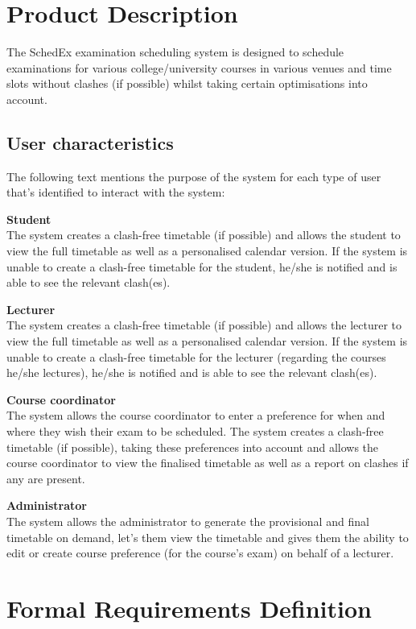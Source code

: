 \documentclass{article}
\begin{document}
\section{Product Description}

The SchedEx examination scheduling system is designed to schedule examinations for various college/university courses in various venues and time slots without clashes (if possible) whilst taking certain optimisations into account.

\subsection{User characteristics}

The following text mentions the purpose of the system for each type of user that's identified to interact with the system:

\textbf{Student} \\
The system creates a clash-free timetable (if possible) and allows the student to view the full timetable as well as a personalised calendar version. If the system is unable to create a clash-free timetable for the student, he/she is notified and is able to see the relevant clash(es).

\textbf{Lecturer} \\
The system creates a clash-free timetable (if possible) and allows the lecturer to view the full timetable as well as a personalised calendar version. If the system is unable to create a clash-free timetable for the lecturer (regarding the courses he/she lectures), he/she is notified and is able to see the relevant clash(es).

\textbf{Course coordinator} \\
The system allows the course coordinator to enter a preference for when and where they wish their exam to be scheduled. The system creates a clash-free timetable (if possible), taking these preferences into account and allows the course coordinator to view the finalised timetable as well as a report on clashes if any are present.

\textbf{Administrator} \\
The system allows the administrator to generate the provisional and final timetable on demand, let's them view the timetable and gives them the ability to edit or create course preference (for the course's exam) on behalf of a lecturer.

\section{Formal Requirements Definition}
\end{document}
